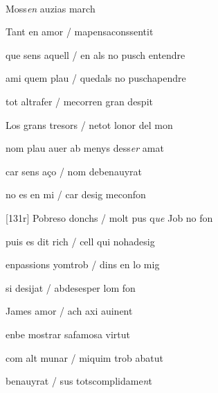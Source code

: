 \documentclass[12pt]{article}
\renewcommand{\espaiAbansEtiquetaPoema}{\vspace{0ex}}
\begin{document}
\begin{estrofa}

\espaiAbansEtiquetaPoema

\\

\begin{rubrica}

Moss\textit{en} auzias march

\end{rubrica}

\end{estrofa}


\begin{estrofa}

 Tant en amor / mapensaconssentit

 que sens aquell / en als no pusch entendre

 ami quem plau / quedals no puschapendre

 tot altrafer / mecorren gran despit

 Los grans tresors / netot lonor del mon

 nom plau auer ab menys dess\textit{er} amat

 car sens a\c{c}o / nom debenauyrat

 no es en mi / car desig meconfon

\end{estrofa}



\begin{estrofa}

 [131r] Pobreso donchs / molt pus q\textit{ue} Job no fon

 puis es dit rich / cell qui nohadesig

 enpassions yomtrob / dins en lo mig

 si desijat / abdesesper lom fon

 James amor / ach axi auinent

 enbe mostrar safamosa virtut

 com alt munar / miquim trob abatut

 benauyrat / sus totscomplidame\textit{n}t

\end{estrofa}
\end{document}
